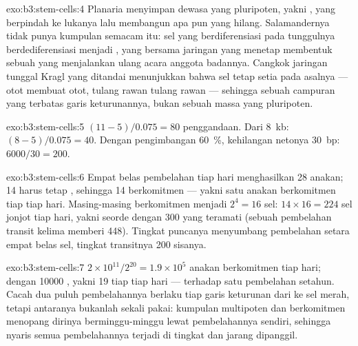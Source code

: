 \begin{solution}{exo:b3:stem-cells:4}
Planaria menyimpan  dewasa yang pluripoten, yakni , yang
berpindah ke lukanya lalu membangun apa pun yang hilang. Salamandernya tidak punya
kumpulan semacam itu: sel yang berdiferensiasi pada tunggulnya berdediferensiasi menjadi
, yang bersama  jaringan yang menetap membentuk sebuah 
yang menjalankan ulang acara anggota badannya. Cangkok jaringan tunggal Kragl yang
ditandai menunjukkan bahwa sel  tetap setia pada asalnya ---
otot membuat otot, tulang rawan tulang rawan --- sehingga  sebuah
campuran  yang terbatas garis keturunannya, bukan sebuah massa yang pluripoten.
\end{solution}

\begin{solution}{exo:b3:stem-cells:5}
$(11 - 5)/0.075 = 80$ penggandaan. Dari \qty{8}{kb}: $(8 - 5)/0.075 = 40$.
Dengan pengimbangan \qty{60}{\%}, kehilangan netonya \qty{30}{bp}: $6000/30
= 200$.
\end{solution}

\begin{solution}{exo:b3:stem-cells:6}
Empat belas pembelahan  tiap hari menghasilkan 28 anakan; 14 harus tetap
, sehingga 14 berkomitmen --- yakni satu anakan berkomitmen tiap  tiap
hari. Masing-masing berkomitmen menjadi $2^{4} = 16$ sel: $14\times 16 = 224$ sel
jonjot tiap hari, yakni seorde dengan \num{300} yang teramati (sebuah pembelahan transit
kelima memberi \num{448}). Tingkat puncanya menyumbang pembelahan setara empat belas sel,
tingkat transitnya \num{200} sisanya.
\end{solution}

\begin{solution}{exo:b3:stem-cells:7}
$2\times 10^{11}/2^{20} = 1.9\times 10^{5}$ anakan berkomitmen tiap hari;
dengan \num{10000} , yakni 19 tiap  tiap hari --- terhadap satu
pembelahan setahun. Cacah dua puluh pembelahannya berlaku tiap garis keturunan dari
 ke sel merah, tetapi  antaranya bukanlah
sekali pakai: kumpulan  multipoten dan berkomitmen menopang dirinya
berminggu-minggu lewat pembelahannya sendiri, sehingga nyaris semua pembelahannya terjadi
di tingkat  dan  jarang dipanggil.
\end{solution}


